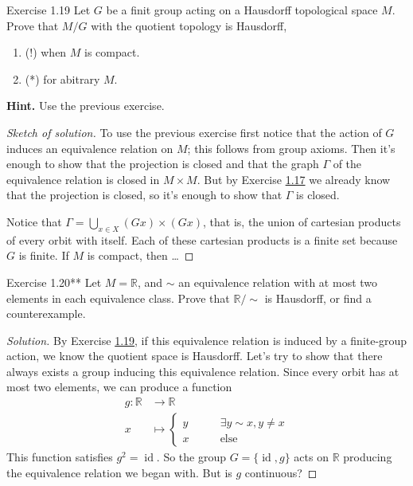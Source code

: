 \begin{thing4}{Exercise 1.19}\label{exer:1.19}\leavevmode
	Let $G$ be a finit group acting on a Hausdorff topological space $M$. Prove that $M/G$ with the quotient topology is Hausdorff,
	\begin{enumerate}[label=(\alph*)]
	\item (!) when $M$ is compact.
	\item  (*) for abitrary $M$.
	\end{enumerate}
	\textbf{Hint.} Use the previous exercise.
\end{thing4}

\begin{proof}[{\color{2}Sketch of solution}]\leavevmode
To use the previous exercise first notice that the action of $G$ induces an equivalence relation on $M$; this follows from group axioms. Then it's enough to show that the projection is closed and that the graph $\Gamma$ of the equivalence relation is closed in $M\times M$. But by Exercise \hyperref[exer:1.17]{1.17} we already know that the projection is closed, so it's enough to show that $\Gamma$ is closed.

Notice that $\Gamma=\bigcup_{x \in X} (Gx)\times (Gx)$, that is, the union of cartesian products of every orbit with itself. Each of these cartesian products is a finite set because $G$ is finite. If $M$ is compact, then {\color{2}…}
\end{proof}

\begin{thing4}{Exercise 1.20**}\label{exer:1.20}\leavevmode
Let $M=\mathbb{R}$, and $\sim$ an equivalence relation with at most two elements in each equivalence class. Prove that $\mathbb{R}/\sim$ is Hausdorff, or find a counterexample.
\end{thing4}

\begin{proof}[Solution]\leavevmode
By Exercise \hyperref[exer:1.19]{1.19}, if this equivalence relation is induced by a finite-group action, we know the quotient space is Hausdorff. Let's try to show that there always exists a group inducing this equivalence relation. Since every orbit has at most two elements, we can produce a function
\begin{align*}
	g: \mathbb{R} &\longrightarrow \mathbb{R} \\
	x &\longmapsto \begin{cases}
		y\qquad &\exists y\sim x,y \neq x \\
		x\qquad & \text{else} 
	\end{cases} 
\end{align*}
This function satisfies $g^2=\operatorname{id}$. So the group $G=\{\operatorname{id},g\}$ acts on $\mathbb{R}$ producing the equivalence relation we began with. {\color{2}But is $g$ continuous?}
\end{proof}

